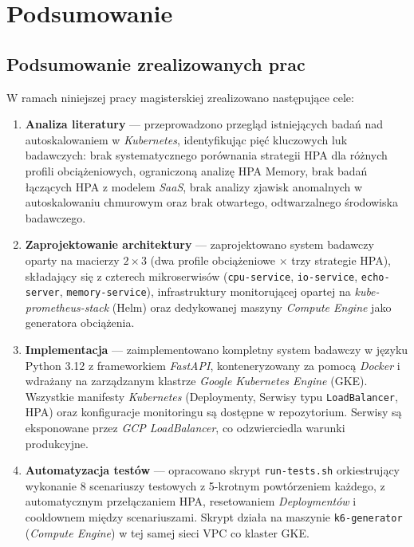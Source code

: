 \chapter{Podsumowanie}

\section{Podsumowanie zrealizowanych prac}

W ramach niniejszej pracy magisterskiej zrealizowano następujące cele:

\begin{enumerate}
  \item \textbf{Analiza literatury} — przeprowadzono przegląd istniejących badań nad autoskalowaniem w \textit{Kubernetes}, identyfikując pięć kluczowych luk badawczych: brak systematycznego porównania strategii HPA dla różnych profili obciążeniowych, ograniczoną analizę HPA Memory, brak badań łączących HPA z modelem \textit{SaaS}, brak analizy zjawisk anomalnych w autoskalowaniu chmurowym oraz brak otwartego, odtwarzalnego środowiska badawczego.

  \item \textbf{Zaprojektowanie architektury} — zaprojektowano system badawczy oparty na macierzy $2 \times 3$ (dwa profile obciążeniowe $\times$ trzy strategie HPA), składający się z czterech mikroserwisów (\texttt{cpu-service}, \texttt{io-service}, \texttt{echo-server}, \texttt{memory-service}), infrastruktury monitorującej opartej na \textit{kube-prometheus-stack} (Helm) oraz dedykowanej maszyny \textit{Compute Engine} jako generatora obciążenia.

  \item \textbf{Implementacja} — zaimplementowano kompletny system badawczy w języku Python 3.12 z frameworkiem \textit{FastAPI}, konteneryzowany za pomocą \textit{Docker} i wdrażany na zarządzanym klastrze \textit{Google Kubernetes Engine} (GKE). Wszystkie manifesty \textit{Kubernetes} (Deploymenty, Serwisy typu \texttt{LoadBalancer}, HPA) oraz konfiguracje monitoringu są dostępne w repozytorium. Serwisy są eksponowane przez \textit{GCP LoadBalancer}, co odzwierciedla warunki produkcyjne.

  \item \textbf{Automatyzacja testów} — opracowano skrypt \texttt{run-tests.sh} orkiestrujący wykonanie 8 scenariuszy testowych z 5-krotnym powtórzeniem każdego, z automatycznym przełączaniem HPA, resetowaniem \textit{Deploymentów} i cooldownem między scenariuszami. Skrypt działa na maszynie \texttt{k6-generator} (\textit{Compute Engine}) w tej samej sieci VPC co klaster GKE.


\end{enumerate}

